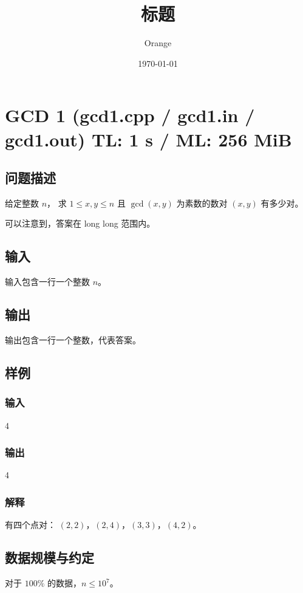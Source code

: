 \documentclass[UTF8]{article}
\title{标题}
\author{Orange}
\date{\today}
\begin{document}
	\heiti

	\section{GCD 1 \small(gcd1.cpp / gcd1.in / gcd1.out) TL: 1 s / ML: 256 MiB}
	\subsection{问题描述}
	给定整数 $n$，
	求 $1 \le x, y \le n$ 且 $\gcd(x, y)$ 为素数的数对 $(x, y)$ 有多少对。

	可以注意到，答案在 long long 范围内。

	\subsection{输入}
	输入包含一行一个整数 $n$。

	\subsection{输出}
	输出包含一行一个整数，代表答案。

	\subsection{样例}
	\subsubsection{输入}
	4

	\subsubsection{输出}
	4

	\subsubsection{解释}
	有四个点对：
	$(2, 2)$，$(2, 4)$，$(3, 3)$，$(4,2)$。

	\subsection{数据规模与约定}
	对于 $100\%$ 的数据，$n \le 10^7$。
\end{document}
